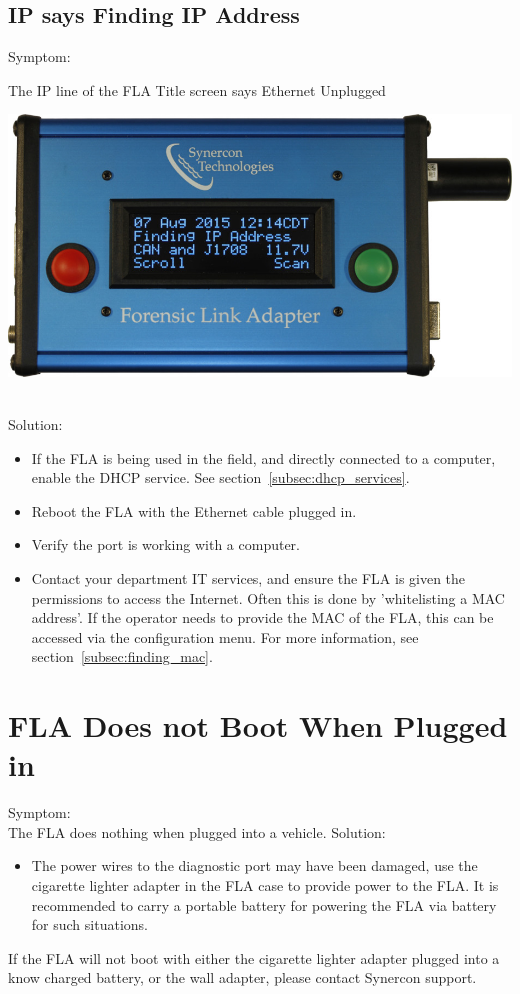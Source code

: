 \documentclass[11pt, oneside]{book}
\begin{document}
\subsection{IP says Finding IP Address}
Symptom:\\
\noindent\begin{minipage}{0.45\textwidth}%
The IP line of the FLA Title screen says Ethernet Unplugged
\end{minipage}%
\hfill%
\begin{minipage}{0.45\textwidth}
\includegraphics[width=\linewidth]{../media/fla_screens/no_ethernet/title_both_finding_ip}
\end{minipage}\\
Solution:\\
\begin{itemize}
\item If the FLA is being used in the field, and directly connected to a computer, enable the DHCP service. See section~\ref{subsec:dhcp_services}.
\item Reboot the FLA with the Ethernet cable plugged in.
\item Verify the port is working with a computer.
\item Contact your department IT services, and ensure the FLA is given the permissions to access the Internet. Often this is done by 'whitelisting a MAC address'. If the operator needs to provide the MAC of the FLA, this can be accessed via the configuration menu. For more information, see section~\ref{subsec:finding_mac}.
\end{itemize}
\section{FLA Does not Boot When Plugged in}
Symptom:\\
The FLA does nothing when plugged into a vehicle.
Solution:\\
\begin{itemize}
\item The power wires to the diagnostic port may have been damaged, use the cigarette lighter adapter in the FLA case to provide power to the FLA. It is recommended to carry a portable battery for powering the FLA via battery for such situations.
\end{itemize}
If the FLA will not boot with either the cigarette lighter adapter plugged into a know charged battery, or the wall adapter, please contact Synercon support.
\end{document}

